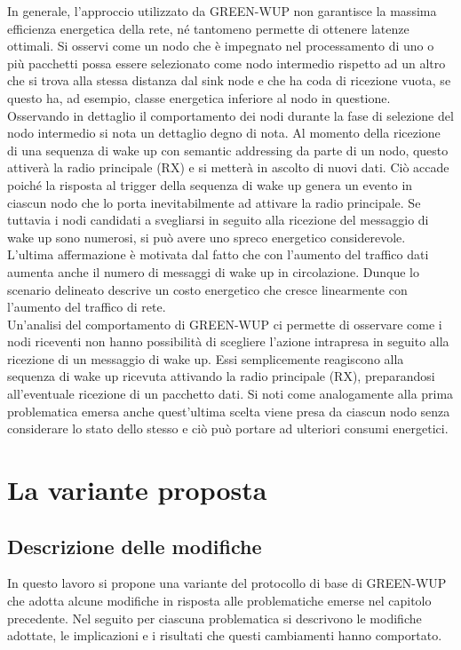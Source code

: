 \documentclass[binding=0.6cm,TFA]{sapthesis}
\begin{document}
In generale, l'approccio utilizzato da GREEN-WUP non garantisce la massima efficienza energetica della rete, né tantomeno permette di ottenere latenze ottimali.
Si osservi come un nodo che è impegnato nel processamento di uno o più pacchetti possa essere selezionato come nodo intermedio rispetto ad un altro che si
trova alla stessa distanza dal sink node e che ha coda di ricezione vuota, se questo ha, ad esempio, classe energetica inferiore al nodo in questione. \\

Osservando in dettaglio il comportamento dei nodi durante la fase di selezione del nodo intermedio si nota un dettaglio degno di nota.
Al momento della ricezione di una sequenza di wake up con semantic addressing da parte di un nodo, questo attiverà la radio principale (RX) e si metterà
in ascolto di nuovi dati. Ciò accade poiché la risposta al trigger della sequenza di wake up genera un evento in ciascun nodo che lo porta
inevitabilmente ad attivare la radio principale. Se tuttavia i nodi candidati a svegliarsi in seguito alla ricezione del messaggio di wake up sono
numerosi, si può avere uno spreco energetico considerevole. L'ultima affermazione è motivata dal fatto che con l'aumento del traffico dati aumenta
anche il numero di messaggi di wake up in circolazione. Dunque lo scenario delineato descrive un costo energetico che cresce linearmente con l'aumento
del traffico di rete.\\

Un'analisi del comportamento di GREEN-WUP ci permette di osservare come i nodi riceventi non hanno possibilità di scegliere l'azione
intrapresa in seguito alla ricezione di un messaggio di wake up. Essi semplicemente reagiscono alla sequenza di wake up ricevuta attivando la radio principale (RX),
preparandosi all'eventuale ricezione di un pacchetto dati. Si noti come analogamente alla prima problematica emersa anche quest'ultima scelta viene presa da
ciascun nodo senza considerare lo stato dello stesso e ciò può portare ad ulteriori consumi energetici.

\chapter{La variante proposta}

\section{Descrizione delle modifiche}

In questo lavoro si propone una variante del protocollo di base di GREEN-WUP che adotta alcune modifiche in risposta alle problematiche emerse nel capitolo
precedente. Nel seguito per ciascuna problematica si descrivono le modifiche adottate, le implicazioni e i risultati che questi cambiamenti hanno comportato.\\
\end{document}
